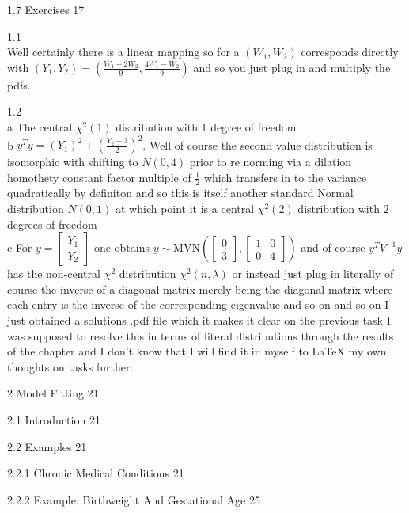 1.7 Exercises 17

1.1 \\
Well certainly there is a linear mapping so for a $(W_1,W_2)$ corresponds directly with $(Y_1,Y_2)=\left(\frac{W_1+2W_2}{9},\frac{4W_1-W_2}{9}\right)$ and so you just plug in and multiply the pdfs.

1.2 \\
a The central $\chi^2(1)$ distribution with $1$ degree of freedom \\
b $y^Ty=(Y_1)^2+\left(\frac{Y_2-3}{2} \right)^2$. Well of course the second value distribution is isomorphic with shifting to $N(0,4)$ prior to re norming via a dilation homothety constant factor multiple of $\frac{1}{2}$ which transfers in to the variance quadratically by definiton and so this is itself another standard Normal distribution $N(0,1)$ at which point it is a central $\chi^2(2)$ distribution with $2$ degrees of freedom \\
c For $y=\begin{bmatrix} Y_1 \\ Y_2 \end{bmatrix}$ one obtains $y \sim \text{MVN} \left(\begin{bmatrix} 0 \\ 3 \end{bmatrix},\begin{bmatrix} 1 & 0 \\ 0 & 4 \end{bmatrix} \right)$ and of course $y^T V^{-1} y$ has the non-central $\chi^2$ distribution $\chi^2(n,\lambda)$ or instead just plug in literally of course the inverse of a diagonal matrix merely being the diagonal matrix where each entry is the inverse of the corresponding eigenvalue and so on and so on I just obtained a solutions .pdf file which it makes it clear on the previous task I was supposed to resolve this in terms of literal distributions through the results of the chapter and I don't know that I will find it in myself to LaTeX my own thoughts on tasks further.

2 Model Fitting 21



2.1 Introduction 21



2.2 Examples 21



2.2.1 Chronic Medical Conditions 21



2.2.2 Example: Birthweight And Gestational Age 25

